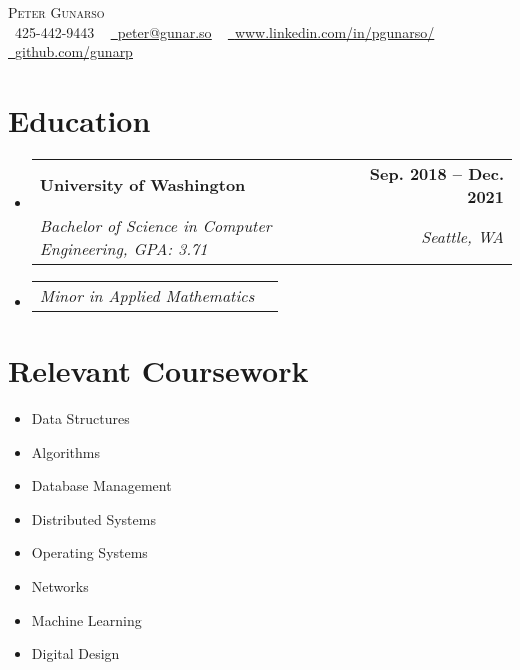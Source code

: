\documentclass[letterpaper,11pt]{article}
\makeatletter
\newcommand{\resumeSubheading}[4]{
  \vspace{-2pt}\item
    \begin{tabular*}{1.0\textwidth}[t]{l@{\extracolsep{\fill}}r}
      \textbf{#1} & \textbf{\small #2} \\
      \textit{\small#3} & \textit{\small #4} \\
    \end{tabular*}\vspace{-7pt}
}
\newcommand{\resumeSubSubheading}[2]{
    \item
    \begin{tabular*}{0.97\textwidth}{l@{\extracolsep{\fill}}r}
      \textit{\small#1} & \textit{\small #2} \\
    \end{tabular*}\vspace{-7pt}
}
\newcommand{\resumeSubHeadingListStart}{\begin{itemize}[leftmargin=0.0in, label={}]}
\newcommand{\resumeSubHeadingListEnd}{\end{itemize}}
\makeatother
\begin{document}

\begin{center}
    {\Huge \scshape Peter Gunarso} \\ \vspace{1pt}
    \small \raisebox{-0.1\height}\faPhone\ 425-442-9443 ~ \href{mailto:peter@gunar.so}{\raisebox{-0.2\height}\faEnvelope\  \underline{peter@gunar.so}} ~
    \href{https://www.linkedin.com/in/pgunarso/}{\raisebox{-0.2\height}\faLinkedin\ \underline{www.linkedin.com/in/pgunarso/}}  ~
    \href{https://github.com/gunarp}{\raisebox{-0.2\height}\faGithub\ \underline{github.com/gunarp}}
    \vspace{-8pt}
\end{center}


\section{Education}
  \resumeSubHeadingListStart
    \resumeSubheading
      {University of Washington}{Sep. 2018 -- Dec. 2021}
      {Bachelor of Science in Computer Engineering, GPA: 3.71}{Seattle, WA}
    \resumeSubSubheading
      {Minor in Applied Mathematics}{}
  \resumeSubHeadingListEnd

\section{Relevant Coursework}
        \begin{multicols}{4}
            \begin{itemize}[itemsep=-5pt, parsep=3pt]
                \item\small Data Structures
                \item Algorithms
                \item Database Management
                \item Distributed Systems
                \item Operating Systems
                \item Networks
                \item Machine Learning
                \item Digital Design
            \end{itemize}
        \end{multicols}
        \vspace*{2.0\multicolsep}
\end{document}
